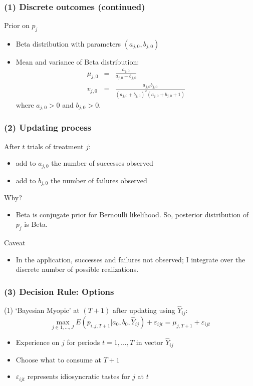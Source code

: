 \documentclass[xcolor=pdftex,dvipsnames,table,mathserif,aspectratio=169]{beamer}
\begin{document}
\begin{frame}
\frametitle{(1) Discrete outcomes (continued)}

Prior on $p_{j}$

\begin{itemize}
\item Beta distribution with parameters $(a_{j,0},b_{j,0})$

\item Mean and variance of Beta distribution: 
\begin{eqnarray*}
\mu _{j,0} &=&\frac{a_{j,0}}{a_{j,0}+b_{j,0}}  \label{mean_parm} \\
v_{j,0} &=&\frac{a_{j,0}b_{j,0}}{(a_{j,0}+b_{j,0})^{2}(a_{j,0}+b_{j,0}+1)}
\end{eqnarray*}
where $a_{j,0}>0$ and $b_{j,0}>0$.
\end{itemize}
\end{frame}


\begin{frame}
\frametitle{(2) Updating process}

After $t$ trials of treatment $j$:

\begin{itemize}
\item add to $a_{j,0}$ the number of successes observed

\item add to $b_{j,0}$ the number of failures observed
\end{itemize}

Why?

\begin{itemize}
\item Beta is conjugate prior for Bernoulli likelihood. So, posterior
distribution of $p_{j}$ is Beta.
\end{itemize}

Caveat

\begin{itemize}
\item In the application, successes and failures not observed; I integrate
over the discrete number of possible realizations.
\end{itemize}
\end{frame}

\begin{frame}
\frametitle{(3) Decision Rule: Options}
\small
(1) `Bayesian Myopic' at $(T+1)$ after updating using $\widehat{Y}_{ij}$: 
\[
\max_{j\in 1,...,J}E(p_{i,j,T+1}|a_{0},b_{0},\widehat{Y}_{ij}) +
\varepsilon_{ijt}=\mu _{j,T+1} + \varepsilon_{ijt} 
\]

\begin{itemize}
\item Experience on $j$ for periods $t=1,...,T$ in vector $\widehat{Y}_{ij}$

\item Choose what to consume at $T+1$

\item $\varepsilon_{ijt}$ represents idiosyncratic tastes for $j$ at $t$
\end{itemize}
\end{frame}
\end{document}
